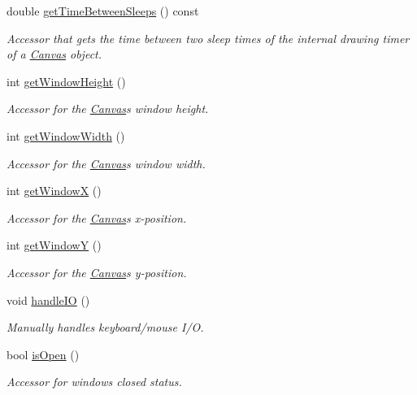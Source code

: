 \begin{DoxyCompactItemize}
double \hyperlink{classtsgl_1_1_canvas_a17e0bf3aaa8e73e6808fbe053c31a8a7}{get\+Time\+Between\+Sleeps} () const
\begin{DoxyCompactList}\small\item\em Accessor that gets the time between two sleep times of the internal drawing timer of a \hyperlink{classtsgl_1_1_canvas}{Canvas} object. \end{DoxyCompactList}\item 
int \hyperlink{classtsgl_1_1_canvas_ad740ebe5d6bd69ab79cde3e84f369f35}{get\+Window\+Height} ()
\begin{DoxyCompactList}\small\item\em Accessor for the \hyperlink{classtsgl_1_1_canvas}{Canvas}\textquotesingle{}s window height. \end{DoxyCompactList}\item 
int \hyperlink{classtsgl_1_1_canvas_a086a0322f4a6ab27da6929b1aa0593af}{get\+Window\+Width} ()
\begin{DoxyCompactList}\small\item\em Accessor for the \hyperlink{classtsgl_1_1_canvas}{Canvas}\textquotesingle{}s window width. \end{DoxyCompactList}\item 
int \hyperlink{classtsgl_1_1_canvas_a011ce2354d4565f9d2a323411a47d52d}{get\+WindowX} ()
\begin{DoxyCompactList}\small\item\em Accessor for the \hyperlink{classtsgl_1_1_canvas}{Canvas}\textquotesingle{}s x-\/position. \end{DoxyCompactList}\item 
int \hyperlink{classtsgl_1_1_canvas_ad6e98d17d3e43d79628a3bd05221ee8b}{get\+WindowY} ()
\begin{DoxyCompactList}\small\item\em Accessor for the \hyperlink{classtsgl_1_1_canvas}{Canvas}\textquotesingle{}s y-\/position. \end{DoxyCompactList}\item 
void \hyperlink{classtsgl_1_1_canvas_aa499851e5e4b97bb99ca4fb3d633c17e}{handle\+IO} ()
\begin{DoxyCompactList}\small\item\em Manually handles keyboard/mouse I/O. \end{DoxyCompactList}\item 
bool \hyperlink{classtsgl_1_1_canvas_ada31408e9a96ecb1639f552d8f0de475}{is\+Open} ()
\begin{DoxyCompactList}\small\item\em Accessor for window\textquotesingle{}s closed status. \end{DoxyCompactList}\item 

\end{DoxyCompactItemize}

